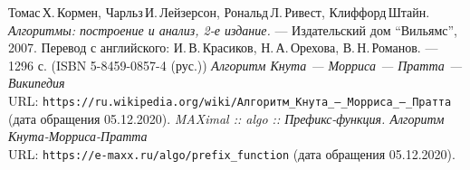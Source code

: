 \begin{thebibliography}{99}
Томас\,Х.\,Кормен, Чарльз\,И.\,Лейзерсон, Рональд\,Л.\,Ривест, Клиффорд\,Штайн.
{\itshape Алгоритмы: построение и анализ, 2-е издание.} --- Издательский дом \enquote{Вильямс}, 2007. Перевод с английского: И.\,В.\,Красиков, Н.\,А.\,Орехова, В.\,Н.\,Романов. --- 1296 с. (ISBN 5-8459-0857-4 (рус.))
{\itshape Алгоритм Кнута --- Морриса --- Пратта --- Википедия} \\ URL: \texttt{https://ru.wikipedia.org/wiki/Алгоритм\_Кнута\_—\_Морриса\_—\_Пратта} (дата обращения 05.12.2020).
{\itshape MAXimal :: algo :: Префикс-функция. Алгоритм Кнута-Морриса-Пратта} \\URL: \texttt{https://e-maxx.ru/algo/prefix\_function} (дата обращения 05.12.2020).
\end{thebibliography}
\pagebreak


